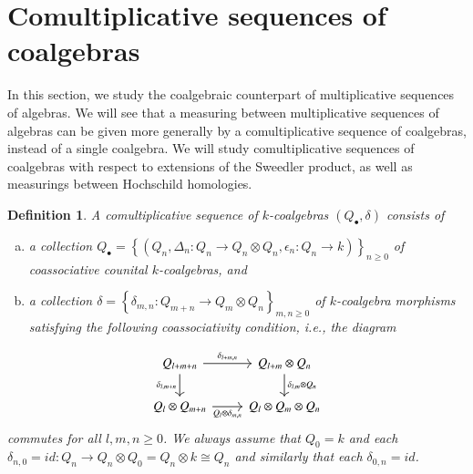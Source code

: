 \documentclass[10pt, colorlinks]{article}
\numberwithin{equation}{section} \DeclareMathSizes{2}{10}{12}{13}
\newtheorem{defn}[thm]{Definition}
\begin{document}
    \section{Comultiplicative sequences of coalgebras}


In this section, we study the coalgebraic counterpart of multiplicative sequences of algebras. We will see that a measuring between multiplicative sequences of algebras can be given more generally by a comultiplicative sequence of coalgebras, instead of a single coalgebra. We will study   comultiplicative sequences of coalgebras with respect to extensions of the Sweedler product, as well as measurings between Hochschild homologies. 

   
      \begin{defn}\label{defn6.1}
        A comultiplicative sequence of $k$-coalgebras $(Q_\bullet,\delta)$ consists of 
        \begin{enumerate}[(a)]
            \item a collection $Q_\bullet=\left\{(Q_n,\Delta_n:Q_n\longrightarrow Q_n\otimes Q_n,\epsilon_n:Q_n\longrightarrow k)\right\}_{n\geq 0}$ of coassociative counital $k$-coalgebras, and 
            \item a collection $\delta=\left\{\delta_{m,n}: Q_{m+n}\longrightarrow Q_m\otimes Q_n\right\}_{m,n\geq 0}$ of $k$-coalgebra morphisms satisfying the following coassociativity condition,          i.e., the diagram 
        \end{enumerate}
            \begin{equation}\label{6.1rdig}
\begin{tikzcd}
Q_{l+m+n}
\arrow[r, "\delta_{l+m,n} "]
\arrow[d, "\delta_{l,m+n}"']
& Q_{l+m} \otimes Q_n \arrow[d, "\delta_{l,m}\otimes Q_n"] \\
Q_l \otimes Q_{m+n}
\arrow[r, "Q_l\otimes\delta_{m,n}"']
& Q_l \otimes Q_m \otimes Q_n
\end{tikzcd}
\end{equation}
commutes for all $l,m,n\geq 0$. 
We always assume that $Q_0=k$ and each $\delta_{n,0}=id:Q_n\longrightarrow Q_n\otimes Q_0=Q_n\otimes k\cong Q_n$ and similarly that each $\delta_{0,n}=id$.


\end{defn}
\end{document}
